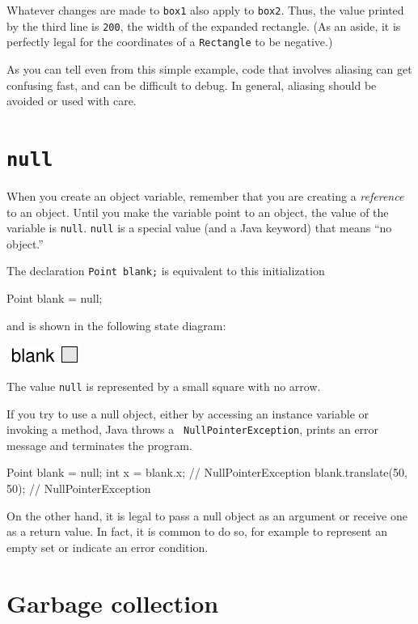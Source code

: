 Whatever changes are
made to {\tt box1} also apply to {\tt box2}.  Thus, the
value printed by the third line is {\tt 200}, the width of
the expanded rectangle. (As an aside, it is perfectly legal
for the coordinates of a {\tt Rectangle} to be negative.)

As you can tell even from this simple example, code that
involves aliasing can get confusing fast, and can be
difficult to debug.  In general, aliasing should be avoided
or used with care.


\section{{\tt null}}

When you create an object variable, remember that you are
creating a {\em reference} to an object.  Until you make
the variable point to an object, the value of the variable
is {\tt null}.  {\tt null} is a special value (and
a Java keyword) that means ``no object.''

The declaration {\tt Point blank;} is equivalent to this
initialization

\begin{code}
    Point blank = null;
\end{code}
%
and is shown in the following state diagram:


\includegraphics{figs/reference2.pdf}


The value {\tt null} is represented by a small square with no arrow.


If you try to use a null object, either by accessing an instance
variable or invoking a method, Java throws a {\tt
NullPointerException}, prints an error message
and terminates the program.

\begin{code}
    Point blank = null;
    int x = blank.x;              // NullPointerException
    blank.translate(50, 50);      // NullPointerException
\end{code}
%
On the other hand, it is legal to pass a null object as an argument or
receive one as a return value.  In fact, it is common to do so, for
example to represent an empty set or indicate an error condition.


\section{Garbage collection}

